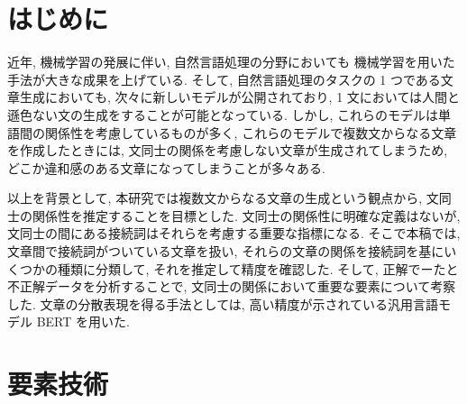 \documentclass[twocolumn]{jarticle}     %
\begin{document}

\section{はじめに}
近年, 機械学習の発展に伴い, 自然言語処理の分野においても
機械学習を用いた手法が大きな成果を上げている.  
そして, 自然言語処理のタスクの 1 つである文章生成においても, 次々に新しいモデルが公開されており, 
1 文においては人間と遜色ない文の生成をすることが可能となっている. 
しかし, これらのモデルは単語間の関係性を考慮しているものが多く, 
これらのモデルで複数文からなる文章を作成したときには, 
文同士の関係を考慮しない文章が生成されてしまうため, 
どこか違和感のある文章になってしまうことが多々ある. \par
以上を背景として, 本研究では複数文からなる文章の生成という観点から, 文同士の関係性を推定することを目標とした. 
文同士の関係性に明確な定義はないが, 文同士の間にある接続詞はそれらを考慮する重要な指標になる. 
そこで本稿では, 文章間で接続詞がついている文章を扱い, 
それらの文章の関係を接続詞を基にいくつかの種類に分類して, それを推定して精度を確認した. 
そして, 正解でーたと不正解データを分析することで, 文同士の関係において重要な要素について考察した. 
文章の分散表現を得る手法としては, 高い精度が示されている汎用言語モデル BERT を用いた. 

\section{要素技術}
\end{document}
